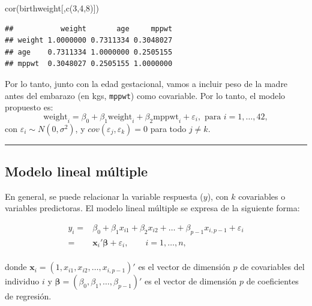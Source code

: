 \documentclass[
]{article}
\newenvironment{Shaded}{\begin{snugshade}}{\end{snugshade}}
\newcommand{\DecValTok}[1]{\textcolor[rgb]{0.00,0.00,0.81}{#1}}
\newcommand{\FunctionTok}[1]{\textcolor[rgb]{0.00,0.00,0.00}{#1}}
\newcommand{\NormalTok}[1]{#1}
\begin{document}
\begin{Shaded}
\begin{Highlighting}[]
\FunctionTok{cor}\NormalTok{(birthweight[,}\FunctionTok{c}\NormalTok{(}\DecValTok{3}\NormalTok{,}\DecValTok{4}\NormalTok{,}\DecValTok{8}\NormalTok{)])}
\end{Highlighting}
\end{Shaded}

\begin{verbatim}
##           weight       age     mppwt
## weight 1.0000000 0.7311334 0.3048027
## age    0.7311334 1.0000000 0.2505155
## mppwt  0.3048027 0.2505155 1.0000000
\end{verbatim}

Por lo tanto, junto con la edad gestacional, vamos a incluir peso de la madre antes del embarazo (en kgs, \texttt{mppwt}) como covariable. Por lo tanto, el modelo propuesto es:
\[
\mbox{weight}_{i} = \beta_{0} + \beta_{1}\mbox{weight}_{i} + \beta_{2}\mbox{mppwt}_{i} + \varepsilon_{i}, \mbox{ para }i=1,\ldots,42,
\]
con \(\varepsilon_{i}\sim N(0,\sigma^{2})\), y \(cov(\varepsilon_{j},\varepsilon_{k})=0\) para todo \(j\neq k\).

\rule{\textwidth}{0.4pt}

\hypertarget{modelo-lineal-muxfaltiple-1}{%
\subsection{Modelo lineal múltiple}\label{modelo-lineal-muxfaltiple-1}}

En general, se puede relacionar la variable respuesta (\(y\)), con \(k\) covariables o variables predictoras. El modelo lineal múltiple se expresa de la siguiente forma:

\begin{equation}
\begin{split}
y_{i} =& \beta_{0} + \beta_{1}x_{i1} + \beta_{2}x_{i2} + \ldots + \beta_{p-1} x_{i,p-1} + \varepsilon_{i} \\
=& \boldsymbol x_{i}'\boldsymbol \beta+ \varepsilon_{i}, \qquad i=1,\ldots,n, \\
\end{split}
\label{eq:modMultiple}
\end{equation}

donde \(\boldsymbol x_{i} = (1,x_{i1},x_{i2},\ldots,x_{i,p-1})'\) es el vector de dimensión \(p\) de covariables del individuo \(i\) y \(\boldsymbol \beta= (\beta_{0},\beta_{1},\ldots,\beta_{p-1})'\) es el vector de dimensión \(p\) de coeficientes de regresión.
\end{document}
